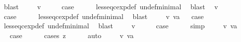 \begin{isabellebody}
\ blast\isanewline
{}\isamarkupfalse%
\isanewline
\ \ \isamarkupfalse%
\ {\isacharparenleft}{\isachardoublequoteopen}{}{\isacharunderscore}{}{\isachardoublequoteclose}\ v{\isacharparenright}\isanewline
\ \ \isamarkupfalse%
\ \isamarkupfalse%
\ {\isacharquery}case\isanewline
\ \ \ \ \isamarkupfalse%
\ less{\isacharunderscore}eq{\isacharunderscore}cexp{\isacharunderscore}def\ undef{\isacharunderscore}minimal\ \isamarkupfalse%
\ blast\isanewline
{}\isamarkupfalse%
\isanewline
{}\isamarkupfalse%
\ {\isacharparenleft}{\isachardoublequoteopen}{}{\isacharunderscore}{}{\isachardoublequoteclose}\ v{\isacharparenright}\isanewline
\ \ \isamarkupfalse%
\ \isamarkupfalse%
\ {\isacharquery}case\isanewline
\ \ \ \ \isamarkupfalse%
\ less{\isacharunderscore}eq{\isacharunderscore}cexp{\isacharunderscore}def\ undef{\isacharunderscore}minimal\ \isamarkupfalse%
\ blast\isanewline
{}\isamarkupfalse%
\isanewline
\ \ \isamarkupfalse%
\ {\isacharparenleft}{\isachardoublequoteopen}{}{\isacharunderscore}{}{\isachardoublequoteclose}\ v\ va{\isacharparenright}\isanewline
{}\isamarkupfalse%
\ \isamarkupfalse%
\ {\isacharquery}case\isanewline
\ \ \ \ \isamarkupfalse%
\ less{\isacharunderscore}eq{\isacharunderscore}cexp{\isacharunderscore}def\ undef{\isacharunderscore}minimal\ \isamarkupfalse%
\ blast\isanewline
{}\isamarkupfalse%
\isanewline
\ \ \isamarkupfalse%
\ {\isacharparenleft}{}\ v{\isacharparenright}\isanewline
\ \ \isamarkupfalse%
\ \isamarkupfalse%
\ {\isacharquery}case\isanewline
\ \ \ \ \isamarkupfalse%
\ simp\isanewline
{}\isamarkupfalse%
\isanewline
\ \ \isamarkupfalse%
\ {\isacharparenleft}{}\ v\ va{\isacharparenright}\isanewline
\ \ \isamarkupfalse%
\ \isamarkupfalse%
\ {\isacharquery}case\isanewline
\ \ \ \ \isamarkupfalse%
\ {\isacharparenleft}cases\ z{\isacharparenright}\isanewline
\ \ \ \ \isamarkupfalse%
\ auto\isanewline
{}\isamarkupfalse%
\isanewline
\ \ \isamarkupfalse%
\ {\isacharparenleft}{\isachardoublequoteopen}{}{\isacharunderscore}{}{\isachardoublequoteclose}\ v\ va{\isacharparenright}\isanewline

\end{isabellebody}
